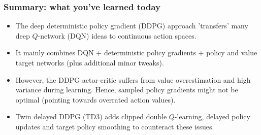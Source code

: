\begin{frame}
	\frametitle{Summary: what you've learned today}
	\begin{itemize}
		\item The deep deterministic policy gradient (DDPG) approach 'transfers' many deep $Q$-network (DQN) ideas to continuous action spaces.\pause
		\item It mainly combines DQN + deterministic policy gradients + policy and value target networks (plus additional minor tweaks).\pause
		\item However, the DDPG actor-critic suffers from value overestimation and high variance during learning. Hence, sampled policy gradients might not be optimal (pointing towards overrated action values).\pause
		\item Twin delayed DDPG (TD3) adds clipped double $Q$-learning, delayed policy updates and target policy smoothing to counteract these issues.
	\end{itemize}
\end{frame}

